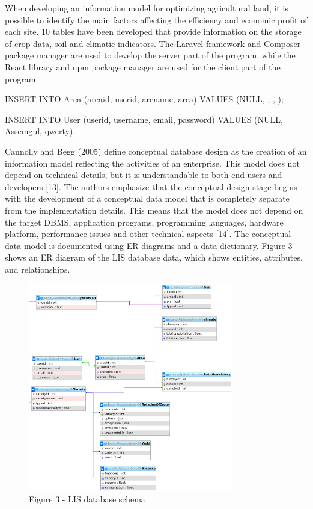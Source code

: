 \begin{multicols}{2}
When developing an information model for optimizing agricultural land,
it is possible to identify the main factors affecting the efficiency and
economic profit of each site. 10 tables have been developed that provide
information on the storage of crop data, soil and climatic indicators.
The Laravel framework and Composer package manager are used to develop
the server part of the program, while the React library and npm package
manager are used for the client part of the program.

INSERT INTO Area (areaid, userid, arename, area) VALUES (NULL,
\textquotesingle, \textquotesingle,
\textquotesingle);

INSERT INTO User (userid, username, email, password) VALUES (NULL,
\textquotesingle Assemgul\textquotesingle,
\textquotesingle qwerty\textquotesingle).

Cannolly and Begg (2005) define conceptual database design as the
creation of an information model reflecting the activities of an
enterprise. This model does not depend on technical details, but it is
understandable to both end users and developers {[}13{]}. The authors
emphasize that the conceptual design stage begins with the development
of a conceptual data model that is completely separate from the
implementation details. This means that the model does not depend on the
target DBMS, application programs, programming languages, hardware
platform, performance issues and other technical aspects {[}14{]}. The
conceptual data model is documented using ER diagrams and a data
dictionary. Figure 3 shows an ER diagram of the LIS database data, which
shows entities, attributes, and relationships.
\end{multicols}

\begin{figure}[H]
	\centering
	\includegraphics[width=0.8\textwidth]{assets/70}
	\caption*{Figure 3 - LIS database schema}
\end{figure}

